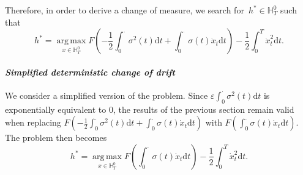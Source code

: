 \documentclass{amsart}[11pt]
\numberwithin{equation}{section}
\numberwithin{theorem}{subsection}
\numberwithin{proposition}{subsection}
\numberwithin{definition}{subsection}
\numberwithin{lemma}{subsection}
\numberwithin{assumption}{subsection}
\newcommand{\HH}{\mathbb{H}}
\newcommand{\QQ}{\mathbb{Q}}
\newcommand{\EE}{\mathbb{E}}
\newcommand{\D}{\mathrm{d}}
\newcommand{\E}{\mathrm{e}}
\newcommand{\eps}{\varepsilon}
\newcommand{\half}{\frac{1}{2}}
\DeclareMathOperator*{\argmax}{arg\,max}
\begin{document}
{%
Therefore, in order to derive a change of measure, we search for~$h^{*} \in \HH_T^0$ such that
$$
h^{*} = \argmax\limits_{x \in \HH_T^0}F\left(-\frac{1}{2}\int_{0}^{\cdot} \sigma^2(t)\D t + \int_{0}^{\cdot} \sigma(t) \dot{x}_t \D t\right)
 - \frac{1}{2}\int_0^T \dot{x}_t^2 \D t.
$$

\paragraph{\textit{Simplified deterministic change of drift}}
We consider a simplified version of the problem. 
Since $\eps\int_{0}^{\cdot}\sigma^2(t)\D t$ is exponentially equivalent to $0$, the results of the previous section remain valid 
when  replacing $F(-\half\int_{0}^{\cdot} \sigma^2(t)\D t + \int_{0}^{\cdot} \sigma(t) \dot{x}_t \D t)$ with $F(\int_{0}^{\cdot} \sigma(t) \dot{x}_t \D t)$. 
The problem then becomes
$$
h^{*} = \argmax\limits_{x \in \HH_T^0} F\left(\int_{0}^{\cdot} \sigma(t) \dot{x}_t \D t\right) - \frac{1}{2}\int_0^T \dot{x}_t^2 \D t.
$$

}
\end{document}
